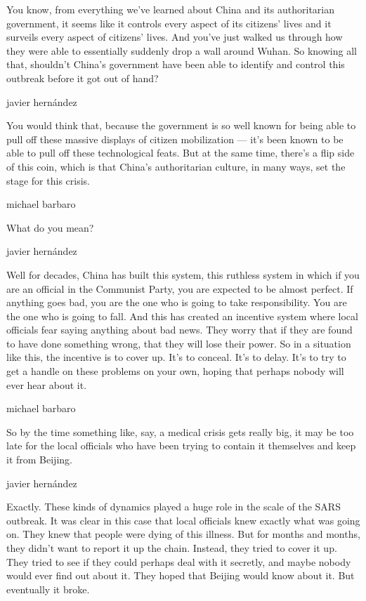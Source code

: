 You know, from everything we've learned about China and its
authoritarian government, it seems like it controls every aspect of its
citizens' lives and it surveils every aspect of citizens' lives. And
you've just walked us through how they were able to essentially suddenly
drop a wall around Wuhan. So knowing all that, shouldn't China's
government have been able to identify and control this outbreak before
it got out of hand?

javier hernández

You would think that, because the government is so well known for being
able to pull off these massive displays of citizen mobilization --- it's
been known to be able to pull off these technological feats. But at the
same time, there's a flip side of this coin, which is that China's
authoritarian culture, in many ways, set the stage for this crisis.

michael barbaro

What do you mean?

javier hernández

Well for decades, China has built this system, this ruthless system in
which if you are an official in the Communist Party, you are expected to
be almost perfect. If anything goes bad, you are the one who is going to
take responsibility. You are the one who is going to fall. And this has
created an incentive system where local officials fear saying anything
about bad news. They worry that if they are found to have done something
wrong, that they will lose their power. So in a situation like this, the
incentive is to cover up. It's to conceal. It's to delay. It's to try to
get a handle on these problems on your own, hoping that perhaps nobody
will ever hear about it.

michael barbaro

So by the time something like, say, a medical crisis gets really big, it
may be too late for the local officials who have been trying to contain
it themselves and keep it from Beijing.

javier hernández

Exactly. These kinds of dynamics played a huge role in the scale of the
SARS outbreak. It was clear in this case that local officials knew
exactly what was going on. They knew that people were dying of this
illness. But for months and months, they didn't want to report it up the
chain. Instead, they tried to cover it up. They tried to see if they
could perhaps deal with it secretly, and maybe nobody would ever find
out about it. They hoped that Beijing would know about it. But
eventually it broke.

